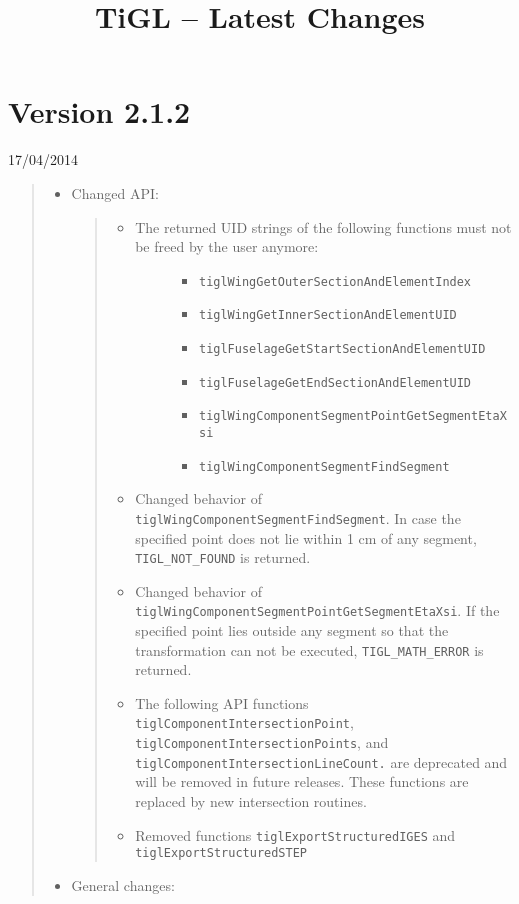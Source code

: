 \documentclass[]{scrartcl}
\author{}
\date{}
\begin{document}
\title{TiGL -- Latest Changes} \maketitle

\section{Version 2.1.2}\label{version-2.1.2}

17/04/2014

\begin{quote}
\begin{itemize}
\item
  Changed API:

  \begin{quote}
  \begin{itemize}
  \item
    \begin{description}
    \item[The returned UID strings of the following functions must not
    be freed by the user anymore:]
    \begin{itemize}
    \itemsep1pt\parskip0pt
    \item
      \texttt{tiglWingGetOuterSectionAndElementIndex}
    \item
      \texttt{tiglWingGetInnerSectionAndElementUID}
    \item
      \texttt{tiglFuselageGetStartSectionAndElementUID}
    \item
      \texttt{tiglFuselageGetEndSectionAndElementUID}
    \item
      \texttt{tiglWingComponentSegmentPointGetSegmentEtaXsi}
    \item
      \texttt{tiglWingComponentSegmentFindSegment}
    \end{itemize}
    \end{description}
  \item
    Changed behavior of \texttt{tiglWingComponentSegmentFindSegment}. In
    case the specified point does not lie within 1 cm of any segment,
    \texttt{TIGL\_NOT\_FOUND} is returned.
  \item
    Changed behavior of
    \texttt{tiglWingComponentSegmentPointGetSegmentEtaXsi}. If the
    specified point lies outside any segment so that the transformation
    can not be executed, \texttt{TIGL\_MATH\_ERROR} is returned.
  \item
    The following API functions \texttt{tiglComponentIntersectionPoint},
    \texttt{tiglComponentIntersectionPoints}, and
    \texttt{tiglComponentIntersectionLineCount.} are deprecated and will
    be removed in future releases. These functions are replaced by new
    intersection routines.
  \item
    Removed functions \texttt{tiglExportStructuredIGES} and
    \texttt{tiglExportStructuredSTEP}
  \end{itemize}
  \end{quote}
\item
  General changes:


\end{itemize}
\end{quote}
\end{document}
